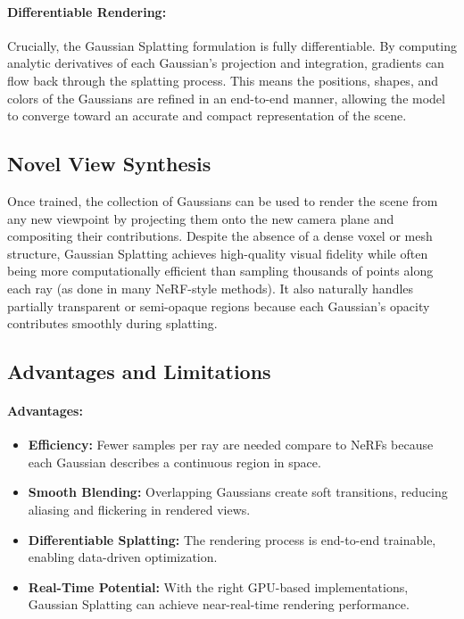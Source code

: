 \paragraph{Differentiable Rendering:}
Crucially, the Gaussian Splatting formulation is fully differentiable.
By computing analytic derivatives of each Gaussian's projection and integration, gradients can flow back through the splatting process.
This means the positions, shapes, and colors of the Gaussians are refined in an end-to-end manner, allowing the model to converge toward an accurate and compact representation of the scene.

\subsection{Novel View Synthesis}
Once trained, the collection of Gaussians can be used to render the scene from any new viewpoint by projecting them onto the new camera plane and compositing their contributions.
Despite the absence of a dense voxel or mesh structure, Gaussian Splatting achieves high-quality visual fidelity while often being more computationally efficient than sampling thousands of points along each ray (as done in many NeRF-style methods).
It also naturally handles partially transparent or semi-opaque regions because each Gaussian's opacity contributes smoothly during splatting.

\subsection{Advantages and Limitations}
\paragraph{Advantages:}
\begin{itemize}
    \item \textbf{Efficiency:} Fewer samples per ray are needed compare to NeRFs because each Gaussian describes a continuous region in space.
    \item \textbf{Smooth Blending:} Overlapping Gaussians create soft transitions, reducing aliasing and flickering in rendered views.
    \item \textbf{Differentiable Splatting:} The rendering process is end-to-end trainable, enabling data-driven optimization.
    \item \textbf{Real-Time Potential:} With the right GPU-based implementations, Gaussian Splatting can achieve near-real-time rendering performance.
\end{itemize}

